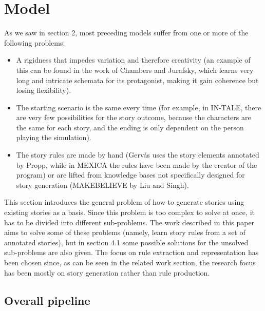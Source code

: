 \section{Model}

As we saw in section 2, most preceding models suffer from one or more
of the following problems:
\begin{itemize}
	\item A rigidness that impedes variation and therefore creativity (an
	example of this can be found in the work
	of Chambers and Jurafsky, which learns very long and intricate schemata for its
	protagonist, making it gain coherence but losing flexibility).
	\item The starting scenario is the same every time (for
	example, in IN-TALE, there are very few possibilities for the story outcome,
	because the characters are the same for each story, and the ending is only
	dependent on the person playing the simulation).
	\item The story rules are made by hand (Gerv\'as uses the story elements annotated
	by Propp, while in MEXICA the rules have been made by the creator of the
	program) or are lifted from knowledge bases not specifically designed for
	story generation (MAKEBELIEVE by Liu and Singh).
\end{itemize}
This section introduces the general problem of how to generate stories using
existing stories as a basis. Since
this problem is too complex to solve at once, it has to be divided into different sub-problems.
The work described in this paper aims to solve some of these problems (namely,
learn story rules from a set of annotated stories), but in
section 4.1 some possible solutions for the unsolved sub-problems are also
given. The focus on rule extraction and representation has been chosen since, as can be seen in the
related work section, the research focus has been mostly on story generation rather than
rule production.

\subsection{Overall pipeline}

